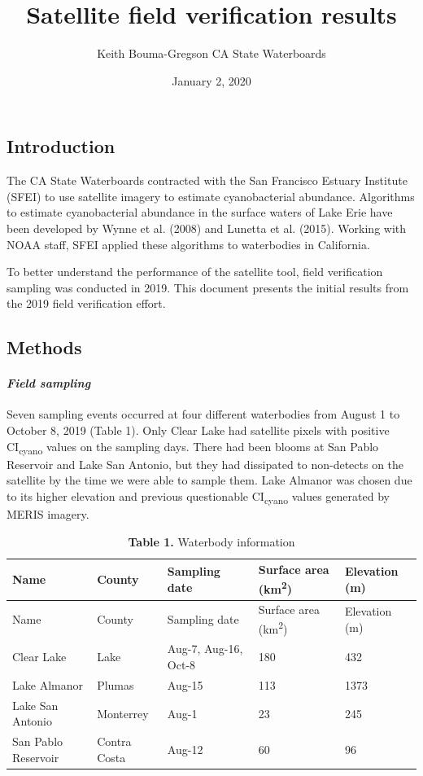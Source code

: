 \documentclass[]{article}
\title{Satellite field verification results}
\author{Keith Bouma-Gregson \textbar{} CA State Waterboards}
\date{January 2, 2020}
\let\oldparagraph\paragraph
\renewcommand{\paragraph}[1]{\oldparagraph{#1}\mbox{}}
\begin{document}
\maketitle

\subsection{\texorpdfstring{\textbf{Introduction}}{Introduction}}\label{introduction}

The CA State Waterboards contracted with the San Francisco Estuary
Institute (SFEI) to use satellite imagery to estimate cyanobacterial
abundance. Algorithms to estimate cyanobacterial abundance in the
surface waters of Lake Erie have been developed by Wynne et al. (2008)
and Lunetta et al. (2015). Working with NOAA staff, SFEI applied these
algorithms to waterbodies in California.

To better understand the performance of the satellite tool, field
verification sampling was conducted in 2019. This document presents the
initial results from the 2019 field verification effort.

\subsection{\texorpdfstring{\textbf{Methods}}{Methods}}\label{methods}

\paragraph{\texorpdfstring{\emph{Field
sampling}}{Field sampling}}\label{field-sampling}

Seven sampling events occurred at four different waterbodies from August
1 to October 8, 2019 (Table 1). Only Clear Lake had satellite pixels
with positive CI\textsubscript{cyano} values on the sampling days. There
had been blooms at San Pablo Reservoir and Lake San Antonio, but they
had dissipated to non-detects on the satellite by the time we were able
to sample them. Lake Almanor was chosen due to its higher elevation and
previous questionable CI\textsubscript{cyano} values generated by MERIS
imagery.

\begin{longtable}[]{@{}lllll@{}}
\caption{\textbf{Table 1.} Waterbody information}\tabularnewline
\toprule
Name & County & Sampling date & Surface area (km\textsuperscript{2}) &
Elevation (m)\tabularnewline
\midrule
\endfirsthead
\toprule
Name & County & Sampling date & Surface area (km\textsuperscript{2}) &
Elevation (m)\tabularnewline
\midrule
\endhead
Clear Lake & Lake & Aug-7, Aug-16, Oct-8 & 180 & 432\tabularnewline
Lake Almanor & Plumas & Aug-15 & 113 & 1373\tabularnewline
Lake San Antonio & Monterrey & Aug-1 & 23 & 245\tabularnewline
San Pablo Reservoir & Contra Costa & Aug-12 & 60 & 96\tabularnewline
\bottomrule
\end{longtable}
\end{document}
